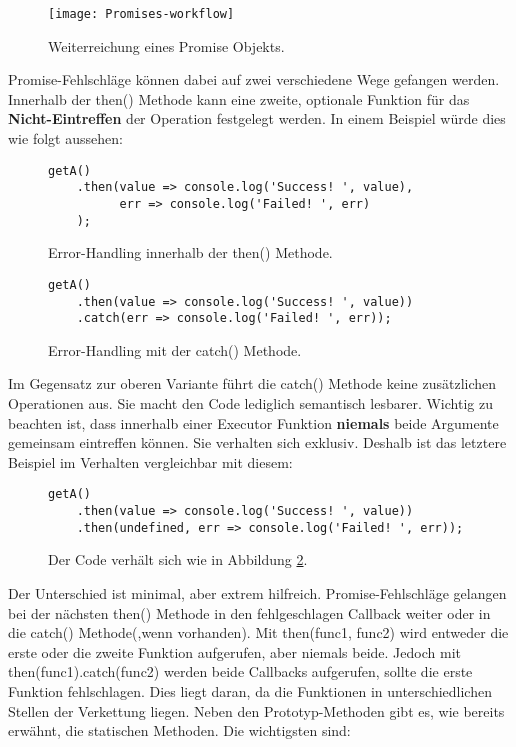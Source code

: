 \begin{figure}[H]
\texttt{[image: Promises-workflow]}
\caption{Weiterreichung eines Promise Objekts\cite{promise-executor}.}
\label{promise-chain-graphic}
\end{figure}

\noindent
Promise-Fehlschläge können dabei auf zwei verschiedene Wege gefangen werden. Innerhalb der then() Methode kann eine zweite, optionale Funktion für das \textbf{Nicht-Eintreffen} der Operation festgelegt werden. In einem Beispiel würde dies wie folgt aussehen:

\begin{figure}[H]
\begin{lstlisting}[basicstyle=\small]
getA()
    .then(value => console.log('Success! ', value),
          err => console.log('Failed! ', err)
    );
\end{lstlisting}
\caption{Error-Handling innerhalb der then() Methode\cite{callback-vs-promises}.}
\end{figure}

\begin{figure}[H]
\begin{lstlisting}[basicstyle=\small]
getA()
    .then(value => console.log('Success! ', value))
    .catch(err => console.log('Failed! ', err));
\end{lstlisting}
\caption{Error-Handling mit der catch() Methode\cite{callback-vs-promises}.}
\label{error-with-catch}
\end{figure}

\noindent
Im Gegensatz zur oberen Variante führt die catch() Methode keine zusätzlichen Operationen aus. Sie macht den Code lediglich semantisch lesbarer. Wichtig zu beachten ist, dass innerhalb einer Executor Funktion \textbf{niemals} beide Argumente gemeinsam eintreffen können. Sie verhalten sich exklusiv. Deshalb ist das letztere Beispiel im Verhalten vergleichbar mit diesem:

\begin{figure}[H]
\begin{lstlisting}[basicstyle=\small]
getA()
    .then(value => console.log('Success! ', value))
    .then(undefined, err => console.log('Failed! ', err));
\end{lstlisting}
\caption{Der Code verhält sich wie in Abbildung \ref{error-with-catch}.}
\end{figure}

\noindent
Der Unterschied ist minimal, aber extrem hilfreich. Promise-Fehlschläge gelangen bei der nächsten then() Methode in den fehlgeschlagen Callback weiter oder in die catch() Methode(,wenn vorhanden). Mit then(func1, func2) wird entweder die erste oder die zweite Funktion aufgerufen, aber niemals beide. Jedoch mit then(func1).catch(func2) werden beide Callbacks aufgerufen, sollte die erste Funktion fehlschlagen. Dies liegt daran, da die Funktionen in unterschiedlichen Stellen der Verkettung liegen. Neben den Prototyp-Methoden gibt es, wie bereits erwähnt, die statischen Methoden. Die wichtigsten sind:

